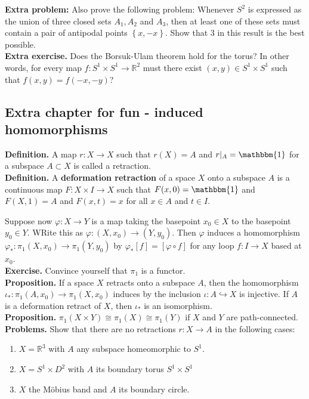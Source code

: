 \documentclass[a4paper]{article}
\theoremstyle{plain}%
\theoremstyle{definition}
\theoremstyle{remark}
\begin{document}
\textbf{Extra problem:} Also prove the following problem: Whenever $S^2$ is expressed
as the union of three closed sets $A_1, A_2$ and $A_3$, then at least one of
these sets must contain a pair of antipodal points $\left\{ x,-x \right\} $.
Show that $3$ in this result is the best possible.\\
\linebreak
\textbf{Extra exercise.} Does the Borsuk-Ulam theorem hold for the torus? In
other words, for every map $f  \colon S^{1} \times S^{1} \to \mathbb{R}^2$ must
there exist $(x,y) \in S^{1} \times S^{1}$ such that $f(x,y) = f(-x,-y)$?


\subsection*{Extra chapter for fun - induced homomorphisms}
\textbf{Definition.} A map $r  \colon X \to X$ such that
$r(X) = A$ and $r |_{A} = \mathbbm{1}$ for a subspace $A \subset X$ is called
a retraction.\\
\linebreak
\textbf{Definition.} A \textbf{deformation retraction} of a space $X$ onto
a subspace $A$ is a continuous map $F  \colon X \times I \to X$ such that
$F(x,0) = \mathbbm{1}$ and $F(X,1) = A$ and
$F(x,t) = x$ for all $x \in A$ and $t \in I$.\\
\linebreak



Suppose now $\varphi  \colon X \to Y$ is a map taking the basepoint $x_0 \in X$
to the basepoint $y_0 \in Y$. WRite this as $\varphi  \colon (X,x_0) \to
(Y,y_0)$. Then $\varphi$ induces a homomorphism
$\varphi_{*}  \colon \pi_1 (X, x_0) \to \pi_1 (Y,y_0)$ by
$\varphi_* \left[ f \right] = \left[ \varphi \circ f \right] $ for any loop
$f  \colon I \to X$ based at $x_0$.\\
\linebreak
\textbf{Exercise.} Convince yourself that $\pi_1$ is a functor.\\
\linebreak
\textbf{Proposition.} If a space $X$ retracts onto a subspace $A$, then the
homomorphism $\iota_{*}  \colon \pi_1(A,x_0) \to \pi_1 (X,x_0)$ induces by the
inclusion $\iota  \colon A \hookrightarrow X$ is injective. If $A$ is
a deformation retract of $X$, then $\iota_*$ is an isomorphism.\\
\linebreak
\textbf{Proposition.} $\pi_1 (X\times Y) \cong \pi_1(X) \cong \pi_1(Y)$ if $X$
and $Y$ are path-connected.\\
\linebreak
\textbf{Problems.} Show that there are no retractions $r  \colon X \to A$ in
the following cases:\\
\begin{enumerate}
    \item $X = \mathbb{R}^3$ with $A$ any subspace homeomorphic to $S^{1}$.
    \item $X = S^{1} \times D^2$ with $A$ its boundary torus $S^{1} \times S^{1}$
    \item $X$ the Möbius band and $A$ its boundary circle.
\end{enumerate}
\end{document}
